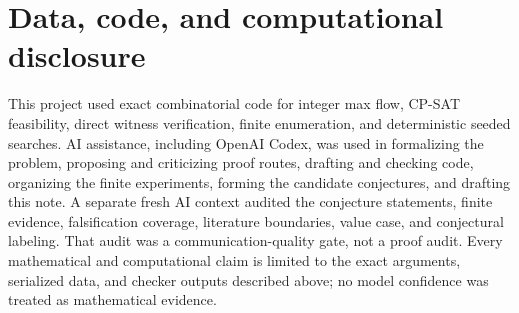\documentclass[11pt]{amsart}
\theoremstyle{definition}
\begin{document}
\section*{Data, code, and computational disclosure}

This project used exact combinatorial code for integer max flow, CP-SAT
feasibility, direct witness verification, finite enumeration, and
deterministic seeded searches.  AI assistance, including OpenAI Codex, was
used in formalizing the problem, proposing and criticizing proof routes,
drafting and checking code, organizing the finite experiments, forming the
candidate conjectures, and drafting this note.  A separate fresh AI context
audited the conjecture statements, finite evidence, falsification coverage,
literature boundaries, value case, and conjectural labeling.  That audit was
a communication-quality gate, not a proof audit.  Every mathematical and
computational claim is limited to the exact arguments, serialized data, and
checker outputs described above; no model confidence was treated as
mathematical evidence.



\end{document}
